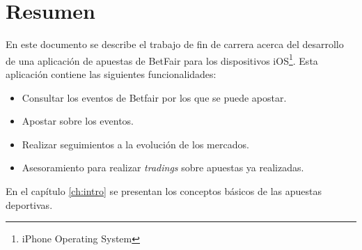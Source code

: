 \chapter*{Resumen}

En este documento se describe el trabajo de fin de carrera acerca del desarrollo de una aplicación de apuestas de BetFair para los dispositivos iOS\footnote{iPhone Operating System}. Esta aplicación contiene las siguientes funcionalidades:
\begin{itemize}
    \item Consultar los eventos de Betfair por los que se puede apostar.
    \item Apostar sobre los eventos.
    \item Realizar seguimientos a la evolución de los mercados.
    \item Asesoramiento para realizar  \emph{tradings}  sobre apuestas ya realizadas.
  \end{itemize}
        
     En el capítulo \ref{ch:intro} se presentan los conceptos básicos
    de las apuestas deportivas.

